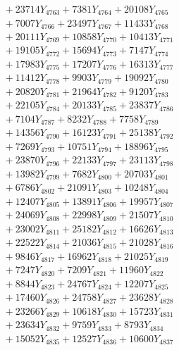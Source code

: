 \documentclass[a4paper,10pt]{article}
\begin{document}
{\begin{align}
&\;  + 23714 Y_{4763} + 7381 Y_{4764} + 20108 Y_{4765} \\[0.3ex]
&\;  + 7007 Y_{4766} + 23497 Y_{4767} + 11433 Y_{4768} \\[0.5ex]\allowbreak
&\;  + 20111 Y_{4769} + 10858 Y_{4770} + 10413 Y_{4771} \\[0.3ex]
&\;  + 19105 Y_{4772} + 15694 Y_{4773} + 7147 Y_{4774} \\[0.3ex]
&\;  + 17983 Y_{4775} + 17207 Y_{4776} + 16313 Y_{4777} \\[0.3ex]
&\;  + 11412 Y_{4778} + 9903 Y_{4779} + 19092 Y_{4780} \\[0.3ex]
&\;  + 20820 Y_{4781} + 21964 Y_{4782} + 9120 Y_{4783} \\[0.3ex]
&\;  + 22105 Y_{4784} + 20133 Y_{4785} + 23837 Y_{4786} \\[0.3ex]
&\;  + 7104 Y_{4787} + 8232 Y_{4788} + 7758 Y_{4789} \\[0.3ex]
&\;  + 14356 Y_{4790} + 16123 Y_{4791} + 25138 Y_{4792} \\[0.3ex]
&\;  + 7269 Y_{4793} + 10751 Y_{4794} + 18896 Y_{4795} \\[0.3ex]
&\;  + 23870 Y_{4796} + 22133 Y_{4797} + 23113 Y_{4798} \\[0.5ex]\allowbreak
&\;  + 13982 Y_{4799} + 7682 Y_{4800} + 20703 Y_{4801} \\[0.3ex]
&\;  + 6786 Y_{4802} + 21091 Y_{4803} + 10248 Y_{4804} \\[0.3ex]
&\;  + 12407 Y_{4805} + 13891 Y_{4806} + 19957 Y_{4807} \\[0.3ex]
&\;  + 24069 Y_{4808} + 22998 Y_{4809} + 21507 Y_{4810} \\[0.3ex]
&\;  + 23002 Y_{4811} + 25182 Y_{4812} + 16626 Y_{4813} \\[0.3ex]
&\;  + 22522 Y_{4814} + 21036 Y_{4815} + 21028 Y_{4816} \\[0.3ex]
&\;  + 9846 Y_{4817} + 16962 Y_{4818} + 21025 Y_{4819} \\[0.3ex]
&\;  + 7247 Y_{4820} + 7209 Y_{4821} + 11960 Y_{4822} \\[0.3ex]
&\;  + 8844 Y_{4823} + 24767 Y_{4824} + 12207 Y_{4825} \\[0.3ex]
&\;  + 17460 Y_{4826} + 24758 Y_{4827} + 23628 Y_{4828} \\[0.5ex]\allowbreak
&\;  + 23266 Y_{4829} + 10618 Y_{4830} + 15723 Y_{4831} \\[0.3ex]
&\;  + 23634 Y_{4832} + 9759 Y_{4833} + 8793 Y_{4834} \\[0.3ex]
&\;  + 15052 Y_{4835} + 12527 Y_{4836} + 10600 Y_{4837} \\[0.3ex]

\end{align}}
\end{document}
